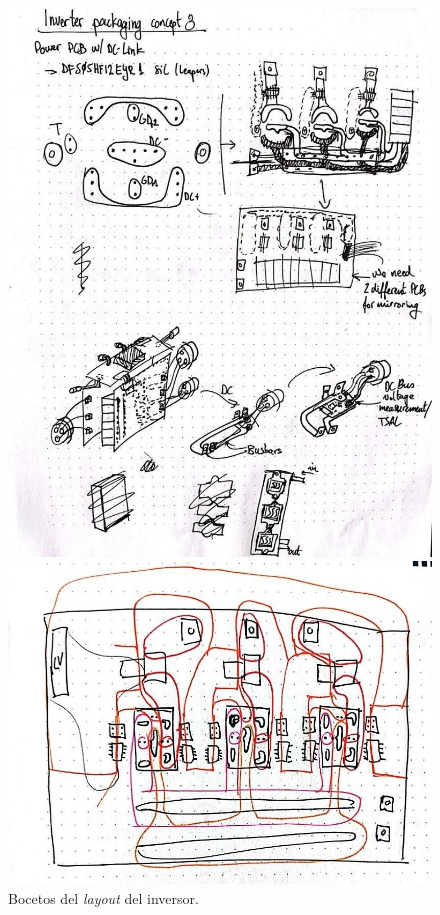 \begin{figure}[H]
	\centering
	\begin{minipage}{0.35\textwidth}
		\centering
		\includegraphics[width=\textwidth]{fig/boceto5}
	\end{minipage}\hfill
	\begin{minipage}{0.55\textwidth}
		\centering
		\includegraphics[width=\textwidth]{fig/boceto6}
	\end{minipage}
	\caption{Bocetos del \textit{layout} del inversor.}
	\label{sketches_layout}
\end{figure}


